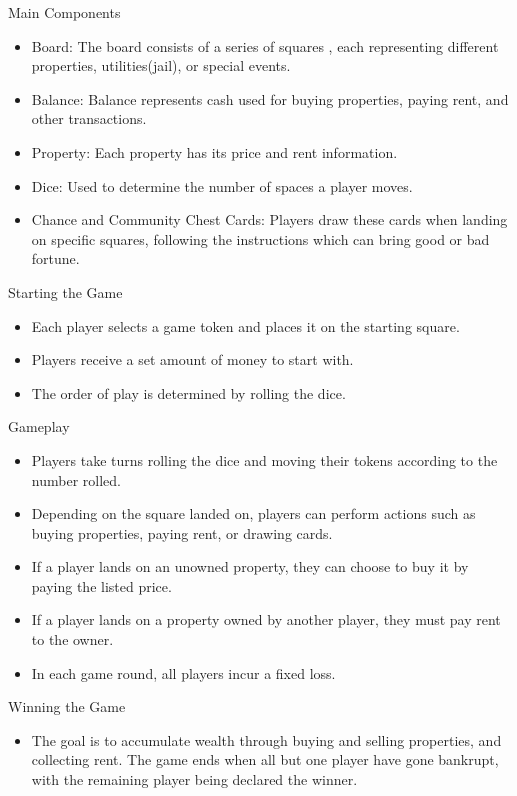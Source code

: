 \documentclass{article}
\begin{document}
    Main Components
    \begin{itemize}
        \item 
        Board: The board consists of a series of squares , each representing different properties, utilities(jail), or special events.
        \item 
        Balance: Balance represents cash used for buying properties, paying rent, and other transactions.
        \item 
        Property: Each property has its price and rent information.
        \item 
        Dice: Used to determine the number of spaces a player moves.
        \item 
        Chance and Community Chest Cards: Players draw these cards when landing on specific squares, following the instructions which can bring good or bad fortune.
    \end{itemize}
    
    Starting the Game
    \begin{itemize}
        \item 
        Each player selects a game token and places it on the starting square.
        \item 
        Players receive a set amount of money to start with.
        \item 
        The order of play is determined by rolling the dice.
    \end{itemize}

    Gameplay
    \begin{itemize}
        \item 
        Players take turns rolling the dice and moving their tokens according to the number rolled.
        \item 
        Depending on the square landed on, players can perform actions such as buying properties, paying rent, or drawing cards.
        \item 
        If a player lands on an unowned property, they can choose to buy it by paying the listed price.
        \item 
        If a player lands on a property owned by another player, they must pay rent to the owner.
        \item 
        In each game round, all players incur a fixed loss.
    \end{itemize}

    Winning the Game
    \begin{itemize}
        \item
        The goal is to accumulate wealth through buying and selling properties, and collecting rent. The game ends when all but one player have gone bankrupt, with the remaining player being declared the winner.
    \end{itemize}
\end{document}
